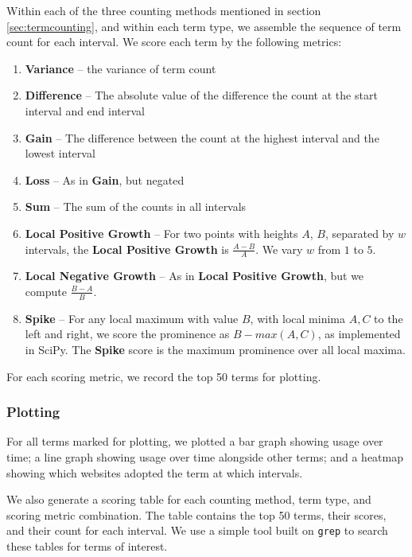 Within each of the three counting methods mentioned in section \ref{sec:termcounting}, and within each term type, we assemble the sequence of term count for each interval. We score each term by the following metrics:
\begin{enumerate}
    \item \textbf{Variance} -- the variance of term count
    \item \textbf{Difference} -- The absolute value of the difference the count at the start interval and end interval
    \item \textbf{Gain} -- The difference between the count at the highest interval and the lowest interval
    \item \textbf{Loss} -- As in \textbf{Gain}, but negated
    \item \textbf{Sum} -- The sum of the counts in all intervals
    \item \textbf{Local Positive Growth} -- For two points with heights $A$, $B$, separated by $w$ intervals, the \textbf{Local Positive Growth} is $\frac{A-B}{A}$. We vary $w$ from $1$ to $5$.
    \item \textbf{Local Negative Growth} -- As in \textbf{Local Positive Growth}, but we compute $\frac{B-A}{B}$.
    \item \textbf{Spike} -- For any local maximum with value $B$, with local minima $A,C$ to the left and right, we score the prominence as $B-max(A,C)$, as implemented in SciPy\cite{2020SciPy-NMeth}. The \textbf{Spike} score is the maximum prominence over all local maxima.
\end{enumerate}
For each scoring metric, we record the top 50 terms for plotting.

\subsubsection{Plotting}
For all terms marked for plotting, we plotted a bar graph showing usage over time; a line graph showing usage over time alongside other terms; and a heatmap showing which websites adopted the term at which intervals.

We also generate a scoring table for each counting method, term type, and scoring metric combination. The table contains the top 50 terms, their scores, and their count for each interval. We use a simple tool built on \verb|grep| to search these tables for terms of interest.


